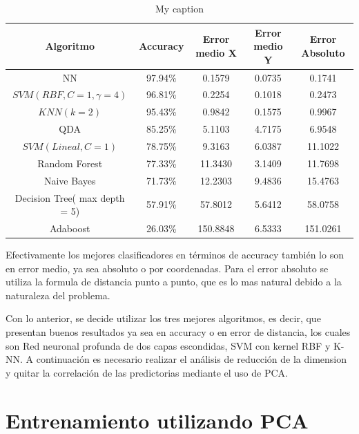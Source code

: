 \begin{table}[ht!]
\centering
\caption{My caption}
\label{my-label}
\begin{tabular}{|c|c|c|c|c|}
\hline
Algoritmo                     & Accuracy & Error medio X & Error medio Y & Error Absoluto \\ \hline
NN                            & 97.94\%  & 0.1579        & 0.0735        & 0.1741         \\ \hline
$SVM(RBF, C=1, \gamma = 4)$   & 96.81\%  & 0.2254        & 0.1018        & 0.2473         \\ \hline
$KNN(k = 2)$                  & 95.43\%  & 0.9842        & 0.1575        & 0.9967         \\ \hline
QDA                           & 85.25\%  & 5.1103        & 4.7175        & 6.9548         \\ \hline
$SVM(Lineal, C=1)$            & 78.75\%  & 9.3163        & 6.0387        & 11.1022        \\ \hline
Random Forest                 & 77.33\%  & 11.3430       & 3.1409        & 11.7698        \\ \hline
Naive Bayes                   & 71.73\%  & 12.2303       & 9.4836        & 15.4763        \\ \hline
Decision Tree( max depth = 5) & 57.91\%  & 57.8012       & 5.6412        & 58.0758        \\ \hline
Adaboost                      & 26.03\%  & 150.8848      & 6.5333        & 151.0261       \\ \hline
\end{tabular}
\end{table}


Efectivamente los mejores clasificadores en términos de accuracy también lo son en error medio, ya sea absoluto o por coordenadas. Para el error absoluto se utiliza la formula de distancia punto a punto, que es lo mas natural debido a la naturaleza del problema.

Con lo anterior, se decide utilizar los tres mejores algoritmos, es decir, que presentan buenos resultados ya sea en accuracy o en error de distancia, los cuales son Red neuronal profunda de dos capas escondidas, SVM con kernel RBF y K-NN. A continuación es necesario realizar el análisis de reducción de la dimension y quitar la correlación de las predictorias mediante el uso de PCA.

\section{Entrenamiento utilizando PCA}

